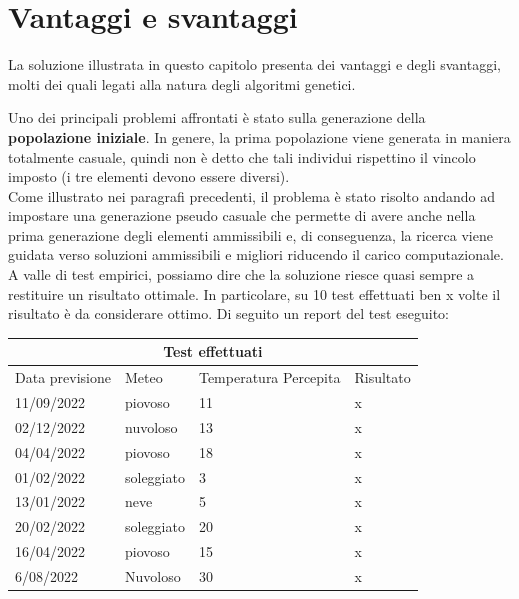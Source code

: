 \documentclass[a4paper, 11pt, oneside]{report}
\begin{document}
            \section{Vantaggi e svantaggi}
            La soluzione illustrata in questo capitolo presenta dei vantaggi e degli svantaggi, molti dei quali legati
            alla natura degli algoritmi genetici.
            \par \noindent Uno dei principali problemi affrontati è stato sulla generazione della \textbf{popolazione iniziale}.
            In genere, la prima popolazione viene generata in maniera totalmente casuale, quindi non è detto che
            tali individui rispettino il vincolo imposto (i tre elementi devono essere diversi).\\
            Come illustrato nei paragrafi precedenti, il problema è stato risolto andando ad impostare una generazione
            pseudo casuale che permette di avere anche nella prima generazione degli elementi ammissibili e, di conseguenza,
            la ricerca viene guidata verso soluzioni ammissibili e migliori riducendo il carico computazionale.\\
            A valle di test empirici, possiamo dire che la soluzione riesce quasi sempre a restituire un risultato ottimale.
            In particolare, su 10 test effettuati ben x volte il risultato è da considerare ottimo.
            Di seguito un report del test eseguito:
            \begin{center}
                \begin{tabular}{ |p{3cm}|p{2cm}|p{2cm}||p{4cm}|}
                    \hline
                    \multicolumn{4}{|c|}{Test effettuati} \\
                    \hline
                    Data previsione & Meteo & Temperatura Percepita & Risultato\\
                    \hline
                    11/09/2022 & piovoso  & 11 & x\\
                    \hline
                    02/12/2022 & nuvoloso  & 13 & x\\
                    \hline
                    04/04/2022 & piovoso  & 18 & x\\
                    \hline
                    01/02/2022 & soleggiato  & 3 & x\\
                    \hline
                    13/01/2022 & neve  & 5 & x\\
                    \hline
                    20/02/2022 & soleggiato  & 20 & x\\
                    \hline
                    16/04/2022 & piovoso  & 15 & x\\
                    \hline
                    6/08/2022 & Nuvoloso  & 30 & x\\
                    \hline
                \end{tabular}
            \end{center}
\end{document}

